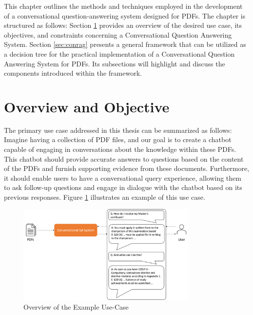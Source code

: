 This chapter outlines the methods and techniques employed in the development of a conversational question-answering system designed for PDFs. The chapter is structured as follows: Section \ref{sec:overview} provides an overview of the desired use case, its objectives, and constraints concerning a Conversational Question Answering System. Section \ref{sec:conrag} presents a general framework that can be utilized as a decision tree for the practical implementation of a Conversational Question Answering System for PDFs. Its subsections will highlight and discuss the components introduced within the framework.

\section{Overview and Objective}
\label{sec:overview}

The primary use case addressed in this thesis can be summarized as follows: Imagine having a collection of PDF files, and our goal is to create a chatbot capable of engaging in conversations about the knowledge within these PDFs. This chatbot should provide accurate answers to questions based on the content of the PDFs and furnish supporting evidence from these documents. Furthermore, it should enable users to have a conversational query experience, allowing them to ask follow-up questions and engage in dialogue with the chatbot based on its previous responses. Figure \ref{fig:use-case} illustrates an example of this use case.

\begin{figure}
    \centering
    \includegraphics[width=0.8\textwidth]{Grafiken/Use_Case.png}
    \caption{Overview of the Example Use-Case}
    \label{fig:use-case}
\end{figure}

